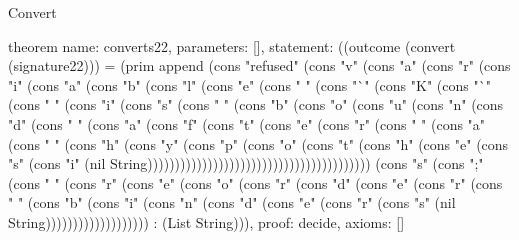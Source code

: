 \begin{lexlean}{Convert}
\begin{semanticmodule}
theorem{
  name: converts22,
  parameters: [],
  statement: ((outcome (convert (signature22))) = (prim append (cons "refused" (cons "v" (cons "a" (cons "r" (cons "i" (cons "a" (cons "b" (cons "l" (cons "e" (cons " " (cons "`" (cons "K" (cons "`" (cons " " (cons "i" (cons "s" (cons " " (cons "b" (cons "o" (cons "u" (cons "n" (cons "d" (cons " " (cons "a" (cons "f" (cons "t" (cons "e" (cons "r" (cons " " (cons "a" (cons " " (cons "h" (cons "y" (cons "p" (cons "o" (cons "t" (cons "h" (cons "e" (cons "s" (cons "i" (nil String))))))))))))))))))))))))))))))))))))))))) (cons "s" (cons ";" (cons " " (cons "r" (cons "e" (cons "o" (cons "r" (cons "d" (cons "e" (cons "r" (cons " " (cons "b" (cons "i" (cons "n" (cons "d" (cons "e" (cons "r" (cons "s" (nil String))))))))))))))))))) : (List String))),
  proof: decide{},
  axioms: []
}


\end{semanticmodule}
\end{lexlean}
